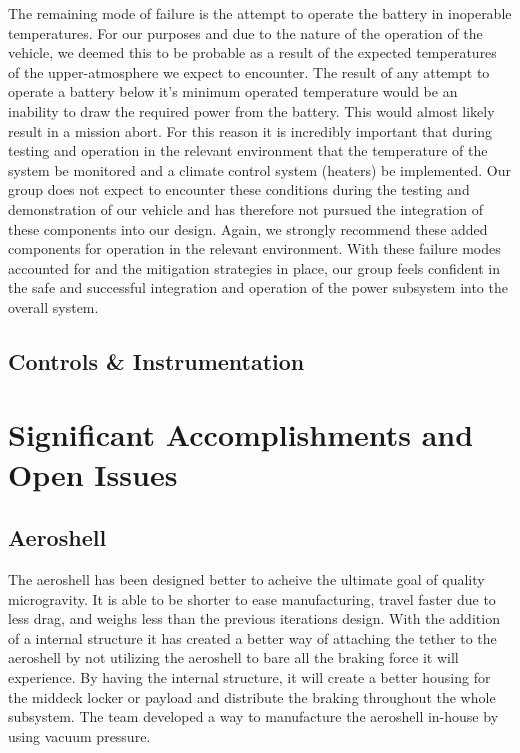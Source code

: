 \indent\indent The remaining mode of failure is the attempt to operate the battery in inoperable temperatures. For our purposes and due to the nature of the operation of the vehicle, we deemed this to be probable as a result of the expected temperatures of the upper-atmosphere we expect to encounter. The result of any attempt to operate a battery below it's minimum operated temperature would be an inability to draw the required power from the battery. This would almost likely result in a mission abort. For this reason it is incredibly important that during testing and operation in the relevant environment that the temperature of the system be monitored and a climate control system (heaters) be implemented. Our group does not expect to encounter these conditions during the testing and demonstration of our vehicle and has therefore not pursued the integration of these components into our design. Again, we strongly recommend these added components for operation in the relevant environment. 
With these failure modes accounted for and the mitigation strategies in place, our group feels confident in the safe and successful integration and operation of the power subsystem into the overall system.


\subsection{Controls \& Instrumentation}




\section{Significant Accomplishments and Open Issues}

\subsection{Aeroshell}

\indent\indent The aeroshell has been designed better to acheive the ultimate goal of quality microgravity. It is able to be shorter to ease manufacturing, travel faster due to less drag, and weighs less than the previous iterations design. With the addition of a internal structure it has created a better way of attaching the tether to the aeroshell by not utilizing the aeroshell to bare all the braking force it will experience. By having the internal structure, it will create a better housing for the middeck locker or payload and distribute the braking throughout the whole subsystem. The team developed a way to manufacture the aeroshell in-house by using vacuum pressure.

